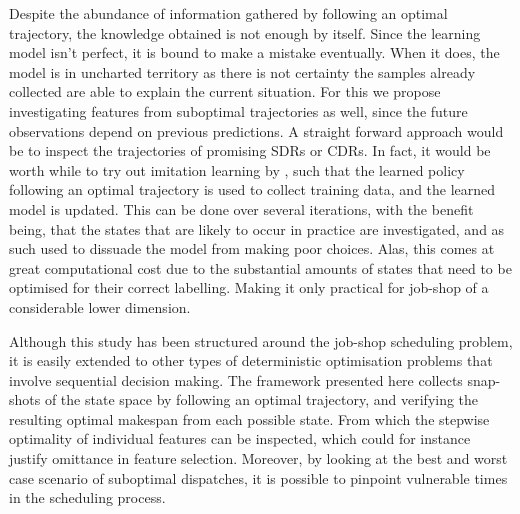 \documentclass[smallextended]{svjour3}
\begin{document}
Despite the abundance of information gathered by following an optimal 
trajectory, the knowledge obtained is not enough by itself. Since the learning 
model isn't perfect, it is bound to make a mistake eventually. When it does, 
the model is in uncharted  territory as there is not certainty the samples 
already collected are able to explain the current situation. For this we 
propose investigating features from suboptimal trajectories as well, since the 
future observations depend on previous predictions. 
 A straight forward approach would be to inspect 
the trajectories of promising SDRs or CDRs. 
In fact, it would be worth while to try out imitation learning by 
\cite{RossB10,RossGB11}, such that the learned policy following an optimal 
trajectory is used to collect training data, and the learned model is updated. 
This can be done over several iterations, with the benefit being, that the 
states that are likely to occur in practice are investigated, and as such used 
to dissuade the model from making poor choices. Alas, this comes at great 
computational cost due to the substantial amounts of states that need to be 
optimised for their correct labelling. Making it only practical for job-shop of 
a considerable lower dimension. 

Although this study has been structured around the job-shop scheduling problem, 
it is easily extended to other types of deterministic optimisation problems 
that involve sequential decision making. 	
The framework presented here collects snap-shots of the state space by 
following an optimal trajectory, and verifying the resulting optimal makespan 
from each possible state. 
From which the stepwise optimality of individual features can be inspected, 
which could for instance justify omittance in feature selection.  
Moreover, by looking at the best and worst case scenario of suboptimal 
dispatches, it is possible to pinpoint vulnerable times in the scheduling 
process. 

  

\end{document}
